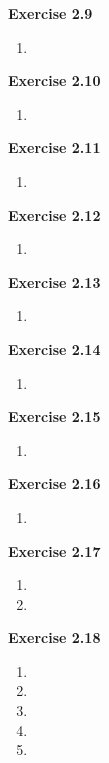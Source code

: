 \textbf{Exercise 2.9}
\begin{enumerate}
    \item 
\end{enumerate}

\textbf{Exercise 2.10}
\begin{enumerate}
    \item 
\end{enumerate}

\textbf{Exercise 2.11}
\begin{enumerate}
    \item 
\end{enumerate}

\textbf{Exercise 2.12}
\begin{enumerate}
    \item 
\end{enumerate}

\textbf{Exercise 2.13}
\begin{enumerate}
    \item 
\end{enumerate}

\textbf{Exercise 2.14}
\begin{enumerate}
    \item 
\end{enumerate}

\textbf{Exercise 2.15}
\begin{enumerate}
    \item 
\end{enumerate}

\textbf{Exercise 2.16}
\begin{enumerate}
    \item 
\end{enumerate}

\textbf{Exercise 2.17}
\begin{enumerate}
    \item 
    \item 
\end{enumerate}

\textbf{Exercise 2.18}
\begin{enumerate}
    \item 
    \item 
    \item 
    \item 
    \item 
\end{enumerate}

